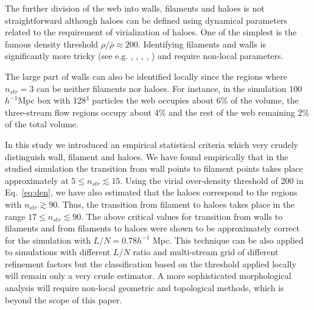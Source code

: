    
 The further division of the web into walls, filaments and haloes is not straightforward although haloes can be defined using dynamical parameters
 related to the requirement of virialization of haloes. One of the simplest is the famous density threshold $\rho/\bar{\rho} \approx 200$. 
 Identifying filaments and walls is significantly more tricky (see e.g. \citealt{Hahn2007}, \citealt{Forero-Romero2009a}, 
  \citealt{Aragon-Calvo2010a}, \citealt{Cautun2014a}, \citealt{Falck2015}) and require non-local parameters.
  
The large part of walls can also be identified locally since the regions where $n_{str} = 3$ can be neither filaments nor haloes. 
For instance, in the simulation  100  $h^{-1}$Mpc box with 128$^3$  particles the web occupies about 6\% of the volume, the three-stream flow
regions occupy about 4\% and the rest of the web remaining 2\% of the total volume.

In this study we introduced an empirical statistical criteria which very crudely distinguish wall, filament and haloes. %
We have found empirically that  in  the studied simulation the transition from wall points to filament points takes place approximately at $ 5 \le n_{str} \lesssim 15$. Using the virial over-density threshold of 200 in Eq.~\ref{eq:den}, we have also estimated that the haloes correspond to the regions with $n_{str} \gtrsim 90$.
Thus, the transition from filament to haloes takes place in the range $ 17 \le n_{str} \lesssim 90$.
The above critical values for transition from walls to filaments and from filaments to haloes were shown to be approximately correct
for  the simulation with $L/N = 0.78 h^{-1}$ Mpc. This technique can be also applied to simulations with different $L/N$ ratio and multi-stream grid of different refinement factors but the classification based on the threshold applied locally will remain only a very crude estimator. A more sophisticated morphological analysis will require non-local geometric and topological methods, which is beyond the scope of this paper.
 
